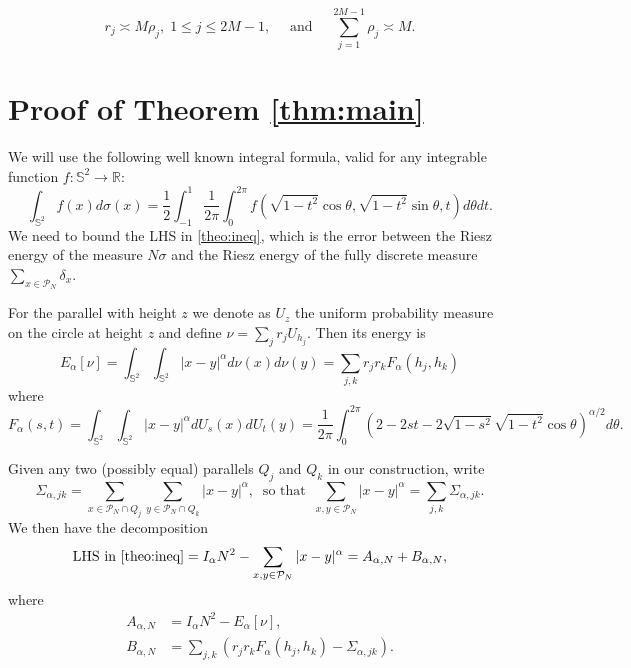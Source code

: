 \documentclass[11pt]{amsart}
\newcommand{\Sph}{\mathbb S^2}
\begin{document}
\begin{equation}\label{eq:geometry}
 r_j\asymp M\rho_j,\;1\leq j\leq 2M-1,\quad  \text{ and  } \quad \sum_{j=1}^{2M-1}\rho_j\asymp M.                    %
\end{equation}



\section{Proof of Theorem \ref{thm:main}}


We will use the following  well known integral formula, valid for any integrable function $f:\mathbb S^2\to\mathbb R$:
\begin{equation}\label{eq:integralaintervalo}\int_{\mathbb S^2}f(x)d\sigma(x)=\frac{1}{2}\int_{-1}^1 \frac{1}{2\pi}\int_0^{2\pi} f(\sqrt{1-t^2}\cos \theta,\sqrt{1-t^2}\sin \theta,t)d\theta dt.
\end{equation}
We need to bound the LHS in \eqref{theo:ineq}, which is the error between the Riesz energy of the measure $N\sigma$ and the Riesz energy of the fully discrete measure $\sum_{x\in\mathcal P_N}\delta_x.$

For the parallel with height $z$ we denote as $U_z$ the uniform probability measure on the circle at height $z$ and define $\nu=\sum_jr_jU_{h_j}.$ Then its energy is
\begin{equation}\label{eq:energianu}E_\alpha[\nu]=\int_{\Sph}\int_{\Sph}|x-y|^\alpha d\nu(x)d\nu(y)=\sum_{j,k}r_jr_k
F_\alpha(h_j,h_k)\end{equation}
where
\begin{equation}\label{eq:Falpha}
 F_\alpha(s,t)=\int_{\Sph}\int_{\Sph}|x-y|^\alpha d U_{s}(x)d U_{t}(y)=\frac1{2\pi}\int_0^{2\pi}
 \left(2-2st-2\sqrt{1-s^2}\sqrt{1-t^2}\cos\theta
 \right)^{\alpha/2}d\theta.
\end{equation}


Given any two (possibly equal) parallels $Q_j$ and $Q_k$ in our construction, write
$$\Sigma_{\alpha,jk}=
\sum_{x \in \mathcal P_N\cap Q_{j}}\sum_{y \in \mathcal P_N\cap Q_{k}}|x-y|^\alpha,\;\;\mbox{so that}\;\;
 \sum_{x,y\in \mathcal{P}_N}|x-y|^\alpha
 =\sum_{j,k}\Sigma_{\alpha,jk}.$$
We then have the decomposition
\begin{equation}\label{eq:decomp}
\text{LHS in \eqref{theo:ineq}}=I_\alpha N^2-\sum_{x,y\in \mathcal{P}_N}|x-y|^\alpha
 =A_{\alpha,N}+B_{\alpha,N},             %
\end{equation}
where
\begin{align*}
 A_{\alpha,N}&=I_\alpha N^2-E_\alpha[\nu],\\
 B_{\alpha,N}&=\sum_{j,k}\left(r_jr_kF_\alpha(h_j,h_k)
                    -\Sigma_{\alpha,jk}\right).
\end{align*}
\end{document}
